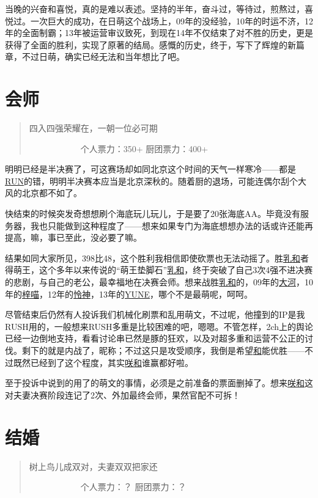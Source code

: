 当晚的兴奋和喜悦，真的是难以表述。坚持的半年，奋斗过，等待过，煎熬过，喜悦过。一次巨大的成功，在日萌这个战场上，09年的没经验，10年的时运不济，12年的全面制霸；13年被运营审议致死，到现在14年不仅结束了对不胜的历史，更是获得了全面的胜利，实现了原著的结局。感慨的历史，终于，写下了辉煌的新篇章，不过日萌，确实已经无法和当年想比了吧。

\chapter{会师}
\begin{quote}
四入四强荣耀在，一朝一位必可期

　　　　　　个人票力：350+ 厨团票力：400+
\end{quote}

明明已经是半决赛了，可这赛场却如同北京这个时间的天气一样寒冷——都是\uline{RUN}的错，明明半决赛本应当是北京深秋的。随着厨的退场，可能连偶尔刮个大风的北京都不如了。

快结束的时候突发奇想想刷个海底玩儿玩儿，于是要了20张海底AA。毕竟没有服务器，我也只能做到这种程度了——想来如果专门为海底想想办法的话或许还能再提高，嘛，事已至此，没必要了嘛。

结果如同大家所见，398比48，这个胜利我相信即使砍票也无法动摇了。胜\uline{乳和}者得萌王，这个多年以来传说的“萌王垫脚石”\uline{乳和}，终于突破了自己3次4强不进决赛的悲剧，与自己的老公，最幸福地在决赛会师。想来战胜\uline{乳和}的，09年的\uline{大河}，10年的\uline{梓喵}，12年的\uline{怜神}，13年的\uline{YUNE}，哪个不是最萌呢，呵呵。

尽管结束后仍然有人投诉我们机械化刷票和乱用萌文，不过呢，他撞到的IP是我RUSH用的，一般想来RUSH多重是比较困难的吧，嗯嗯。不管怎样，2ch上的舆论已经一边倒地支持，看看讨论串已然是豚的狂欢，以及对超多重和运营不公正的讨伐。剩下的就是内战了，昵称；不过这只是攻受顺序，我倒是希望\uline{和}能优胜——不过既然已经到了这个程度，其实\uline{咲}\uline{和}谁赢都好啦。

至于投诉中说到的用了的萌文的事情，必须是之前准备的票面删掉了。想来\uline{咲}\uline{和}这对夫妻决赛阶段连记了2次、外加最终会师，果然官配不可拆！

\chapter{结婚}
\begin{quote}
树上鸟儿成双对，夫妻双双把家还

　　　　　　个人票力：？ 厨团票力：？
\end{quote}

